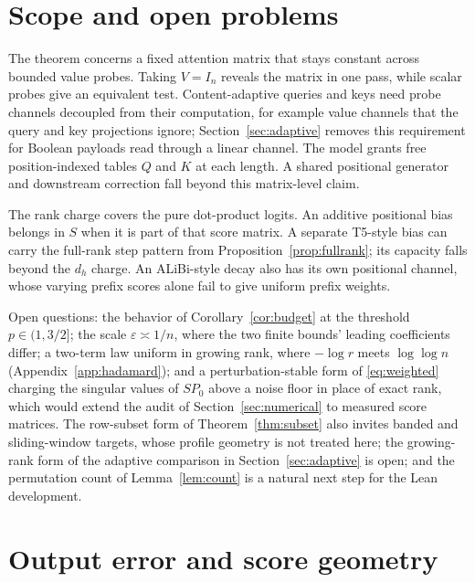 \documentclass[10pt]{article}
\theoremstyle{definition}
\begin{document}
\vspace{.65ex}
\section{Scope and open problems}\label{sec:scope}

The theorem concerns a fixed attention matrix that stays constant across
bounded value probes.  Taking \(V=I_n\) reveals the matrix in one pass, while
scalar probes give an equivalent test.  Content-adaptive queries and keys need
probe channels decoupled from their computation, for example value channels
that the query and key projections ignore; Section~\ref{sec:adaptive}
removes this requirement for Boolean payloads read through a linear channel.  The model grants free
position-indexed tables \(Q\) and \(K\) at each length.  A shared positional
generator and downstream correction fall beyond this matrix-level claim.

The rank charge covers the pure dot-product logits.  An additive positional
bias belongs in \(S\) when it is part of that score matrix.  A separate
T5-style bias can carry the full-rank step pattern from
Proposition~\ref{prop:fullrank}; its capacity falls beyond the \(d_h\) charge.
An ALiBi-style decay also has its own positional channel, whose varying prefix
scores alone fail to give uniform prefix weights.

Open questions: the behavior of Corollary~\ref{cor:budget} at
the threshold \(p\in(1,3/2]\); the scale \(\varepsilon\asymp1/n\), where the
two finite bounds' leading coefficients differ; a two-term law uniform in
growing rank, where \(-\log r\) meets \(\log\log n\)
(Appendix~\ref{app:hadamard}); and a perturbation-stable form of
\eqref{eq:weighted} charging the singular values of \(SP_0\) above a noise
floor in place of exact rank, which would extend the audit of
Section~\ref{sec:numerical} to measured score matrices.  The row-subset form
of Theorem~\ref{thm:subset} also invites banded and sliding-window targets,
whose profile geometry is not treated here; the growing-rank form of the
adaptive comparison in Section~\ref{sec:adaptive} is open; and the
permutation count of
Lemma~\ref{lem:count} is a natural next step for the Lean development.

\appendix

\section{Output error and score geometry}\label{app:profile}
\end{document}
